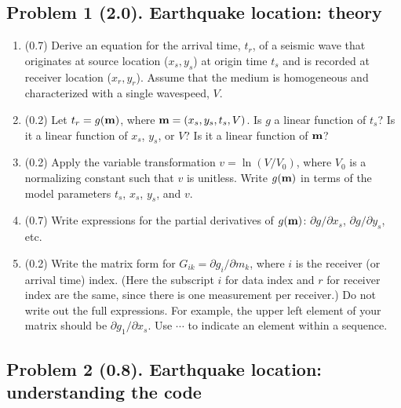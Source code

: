 \documentclass[11pt,titlepage,fleqn]{article}
\begin{document}

\subsection*{Problem 1 (2.0). Earthquake location: theory}

\begin{enumerate}
\item (0.7) Derive an equation for the arrival time, $t_r$,  of a seismic wave that originates at source location ($x_s, y_s$) at origin time $t_s$ and is recorded at receiver location ($x_r, y_r$). Assume that the medium is homogeneous and characterized with a single wavespeed, $V$.

\item (0.2) Let $t_r = g(\mbox{${\bf m}$})$, where $\mbox{${\bf m}$} = (x_s,y_s,t_s,V)$.
Is $g$ a linear function of $t_s$? Is it a linear function of $x_s$, $y_s$, or $V$?
Is it a linear function of $\mbox{${\bf m}$}$?

\item (0.2) Apply the variable transformation $v = \ln(V/V_0)$, where $V_0$ is a normalizing constant such that $v$ is unitless. Write $g(\mbox{${\bf m}$})$ in terms of the model parameters $t_s$, $x_s$, $y_s$, and $v$.

\item (0.7) Write expressions for the partial derivatives of $g(\mbox{${\bf m}$})$: $\partial g/ \partial x_s$, $\partial g/ \partial y_s$, etc.

\item (0.2) Write the matrix form for $G_{ik} = \partial g_i/ \partial m_k$, where $i$ is the receiver (or arrival time) index. (Here the subscript $i$ for data index and $r$ for receiver index are the same, since there is one measurement per receiver.) Do not write out the full expressions.
For example, the upper left element of your matrix should be $\partial g_1/\partial x_s$.
Use $\cdots$ to indicate an element within a sequence.

\end{enumerate}


\pagebreak
\subsection*{Problem 2 (0.8). Earthquake location: understanding the code}
\end{document}
